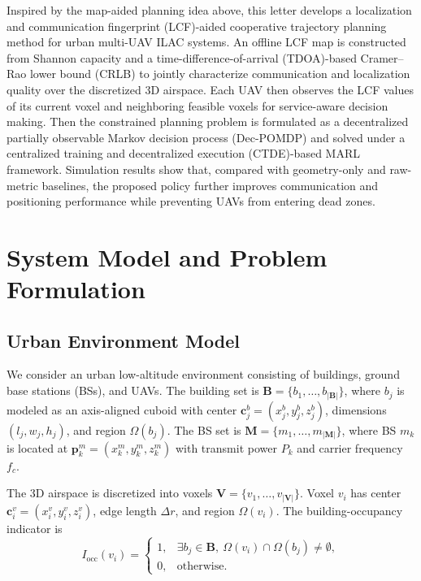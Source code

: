 \documentclass[10pt,journal,letterpaper]{IEEEtran}
\begin{document}
Inspired by the map-aided planning idea above, this letter develops a localization and communication fingerprint (LCF)-aided cooperative trajectory planning method for urban multi-UAV ILAC systems. An offline LCF map is constructed from Shannon capacity and a time-difference-of-arrival (TDOA)-based Cramer--Rao lower bound (CRLB) to jointly characterize communication and localization quality over the discretized 3D airspace. Each UAV then observes the LCF values of its current voxel and neighboring feasible voxels for service-aware decision making. Then the constrained planning problem is formulated as a decentralized partially observable Markov decision process (Dec-POMDP) and solved under a centralized training and decentralized execution (CTDE)-based MARL framework. Simulation results show that, compared with geometry-only and raw-metric baselines, the proposed policy further improves communication and positioning performance while preventing UAVs from entering dead zones.

\section{System Model and Problem Formulation} 

\subsection{Urban Environment Model}

We consider an urban low-altitude environment consisting of buildings, ground base stations (BSs), and UAVs. The building set is $\mathbf{B}=\{b_1,\ldots,b_{|\mathbf{B}|}\}$, where $b_j$ is modeled as an axis-aligned cuboid with center $\mathbf{c}_j^b=(x_j^b,y_j^b,z_j^b)$, dimensions $(l_j,w_j,h_j)$, and region $\Omega(b_j)$. The BS set is $\mathbf{M}=\{m_1,\ldots,m_{|\mathbf{M}|}\}$, where BS $m_k$ is located at $\mathbf{p}_k^m=(x_k^m,y_k^m,z_k^m)$ with transmit power $P_k$ and carrier frequency $f_c$.

The 3D airspace is discretized into voxels $\mathbf{V}=\{v_1,\ldots,v_{|\mathbf{V}|}\}$. Voxel $v_i$ has center $\mathbf{c}_i^v=(x_i^v,y_i^v,z_i^v)$, edge length $\Delta r$, and region $\Omega(v_i)$. The building-occupancy indicator is
\begin{equation}
I_{\mathrm{occ}}(v_i)=
\begin{cases}
1, & \exists b_j\in\mathbf{B},\ \Omega(v_i)\cap\Omega(b_j)\neq\emptyset,\\
0, & \mathrm{otherwise}.
\end{cases}
\end{equation}
\end{document}
